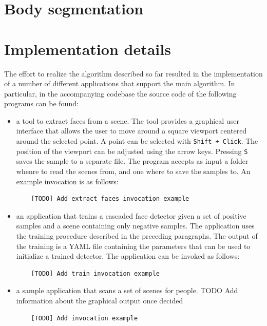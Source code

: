 \documentclass[a4paper,11pt,titlepage]{article}
\begin{document}
\section{Body segmentation}

\section{Implementation details}
The effort to realize the algorithm described so far resulted in the
implementation of a number of different applications that support the main
algorithm. In particular, in the accompanying codebase the source code of the
following programs can be found:

\begin{itemize}
  \item a tool to extract faces from a scene. The tool provides a graphical user
    interface that allows the user to move around a square viewport centered
    around the selected point. A point can be selected with \texttt{Shift +
    Click}. The position of the viewport can be adjusted using the arrow keys.
    Pressing \texttt{S} saves the sample to a separate file. The program accepts
    as input a folder whenre to read the scenes from, and one where to save the
    samples to. An example invocation is as follows:

    \begin{verbatim}
    [TODO] Add extract_faces invocation example
    \end{verbatim}

  \item an application that trains a cascaded face detector given a set of
    positive samples and a scene containing only negative samples. The
    application uses the training procedure described in the preceding
    paragraphs. The output of the training is a YAML file containing the
    parameters that can be used to initialize a trained detector. The
    application can be invoked as follows:

    \begin{verbatim}
    [TODO] Add train invocation example
    \end{verbatim}

  \item a sample application that scans a set of scenes for people.
    TODO Add information about the graphical output once decided

    \begin{verbatim}
    [TODO] Add invocation example
    \end{verbatim}
\end{itemize}
\end{document}

